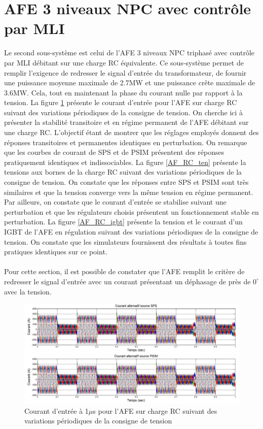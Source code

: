 \clearpage
\section{AFE 3 niveaux NPC avec contrôle par MLI}

Le second sous-système est celui de l'AFE 3 niveaux NPC triphasé avec contrôle par MLI débitant sur une charge RC équivalente. Ce sous-système permet de remplir l'exigence de redresser le signal d'entrée du transformateur, de fournir une puissance moyenne maximale de 2.7MW et une puissance crête maximale de 3.6MW. Cela, tout en maintenant la phase du courant nulle par rapport à la tension. La figure \ref{AF_RC_cou} présente le courant d'entrée pour l'AFE sur charge RC suivant des variations périodiques de la consigne de tension. On cherche ici à présenter la stabilité transitoire et en régime permanent de l'AFE débitant sur une charge RC. L'objectif étant de montrer que les réglages employés donnent des réponses transitoires et permanentes identiques en perturbation. On remarque que les courbes de courant de SPS et de PSIM présentent des réponses pratiquement identiques et indissociables. La figure \ref{AF_RC_ten} présente la tensions aux bornes de la charge RC suivant des variations périodiques de la consigne de tension. On constate que les réponses entre SPS et PSIM sont très similaires et que la tension converge vers la même tension en régime permanent. Par ailleurs, on constate que le courant d'entrée se stabilise suivant une perturbation et que les régulateurs choisis présentent un fonctionnement stable en perturbation. La figure \ref{AF_RC_igbt}
présente la tension et le courant d'un IGBT de l'AFE en régulation suivant des variations périodiques de la consigne de tension. On constate que les simulateurs fournissent des résultats à toutes fins pratiques identiques sur ce point.

\paragraph{}Pour cette section, il est possible de constater que l'AFE remplit le critère de redresser le signal d'entrée avec un courant présentant un déphasage de près de $0^\circ$ avec la tension.
\begin{figure}[htb]
\centering
\includegraphics[scale=0.5]{fig/coual_afe.jpg}
\caption{Courant d'entrée à 1$\mu$s pour l'AFE sur charge RC suivant des variations périodiques de la consigne de tension}
\label{AF_RC_cou}
\end{figure}




